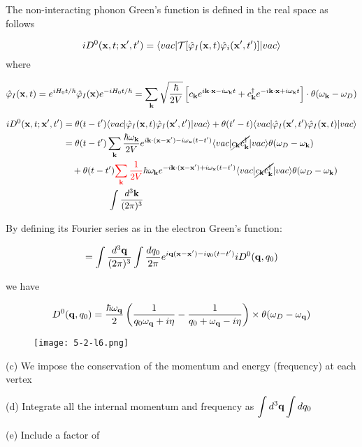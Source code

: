 The non-interacting phonon Green's function is defined in the real space as follows 

\[iD^0({\bf x},t;{\bf x'},t') = \langle vac|\mathcal{T}[\hat\varphi_I({\bf x},t)\hat\varphi_i({\bf x'},t')]|vac\rangle \]
where

\[\hat\varphi_I({\bf x},t) = e^{iH_0t/\hbar}\hat\varphi_I({\bf x})e^{-iH_0t/\hbar} = \sum_{\bf k}\sqrt{\frac{\hbar}{2V}}\left[c_{\bf k}e^{i{\bf k\cdot x} - i\omega_{\bf k}t} + c_{\bf k}^\dagger e^{-i{\bf k\cdot x} + i\omega_{\bf k}t}\right] \cdot\theta(\omega_{\bf k} - \omega_D)\]

\[\begin{split}
iD^0({\bf x},t;{\bf x'},t') &= \theta(t-t')\langle vac|\hat\varphi_I({\bf x},t)\hat\varphi_I({\bf x'},t')|vac\rangle + \theta(t'-t)\langle vac|\hat\varphi_I({\bf x'},t')\hat\varphi_I({\bf x},t)|vac\rangle\\
&= \theta(t-t')\sum_{\bf k}\frac{\hbar\omega_{\bf k}}{2V}e^{i{\bf k\cdot(x-x')}-i\omega_{\bf x}(t-t')}\langle vac|\cancel{c_{\bf k}c_{\bf k}^\dagger}|vac\rangle\theta(\omega_D-\omega_{\bf k})\\
&\ \ \  + \theta(t-t'){\color{red}{\sum_{\bf k}\frac{1}{2V}}}\hbar\omega_{\bf k}e^{-i{\bf k\cdot(x-x')}+i\omega_{\bf x}(t-t')}\langle vac|\cancel{c_{\bf k}c_{\bf k}^\dagger}|vac\rangle\theta(\omega_D-\omega_{\bf k})\\
&\quad\quad\quad\quad\quad\int \frac{d^3\bf k}{(2\pi)^3}\\
\end{split} \]

By defining its Fourier series as in the electron Green's function:

\[=\int \frac{d^3\bf q}{(2\pi)^3}\int \frac{d q_0}{2\pi}e^{i{\bf q(x-x')}-iq_0(t-t')}iD^0({\bf q},q_0) \]

we have

\[D^0({\bf q},q_0)=\frac{\hbar\omega_{\bf q}}{2}\left(\frac{1}{q_0\omega_{\bf q}+i\eta}-\frac{1}{q_0+\omega_{\bf q}-i\eta}\right)\times\theta(\omega_D-\omega_{\bf q}) \]

\begin{wrapfigure}{l}{3cm}
\texttt{[image: 5-2-l6.png]}
\end{wrapfigure}
\noindent (c) We impose the conservation of the momentum and energy (frequency) at each vertex

\noindent (d) Integrate all the internal momentum and frequency as $\displaystyle\int d^3{\bf q}\int dq_0$

\noindent (e) Include a factor of


